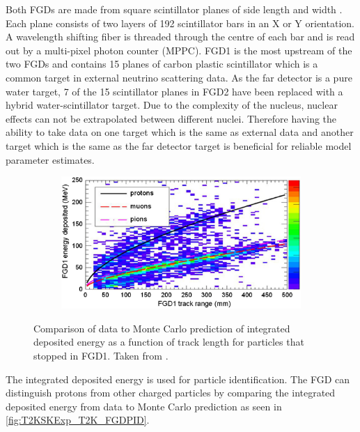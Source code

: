 Both FGDs are made from square scintillator planes of side length  and width . Each plane consists of two layers of 192 scintillator bars in an X or Y orientation. A wavelength shifting fiber is threaded through the centre of each bar and is read out by a multi-pixel photon counter (MPPC). FGD1 is the most upstream of the two FGDs and contains 15 planes of carbon plastic scintillator which is a common target in external neutrino scattering data. As the far detector is a pure water target, 7 of the 15 scintillator planes in FGD2 have been replaced with a hybrid water-scintillator target. Due to the complexity of the nucleus, nuclear effects can not be extrapolated between different nuclei. Therefore having the ability to take data on one target which is the same as external data and another target which is the same as the far detector target is beneficial for reliable model parameter estimates.

\begin{figure}[h]
  \begin{subfigure}[t]{0.7\textwidth}
    \includegraphics[width=\textwidth, trim={0mm 0mm 0mm 0mm}, clip,page=1]{Figures/Detectors/T2KFGDPID.pdf}
  \end{subfigure}
  \caption{Comparison of data to Monte Carlo prediction of integrated deposited energy as a function of track length for particles that stopped in FGD1. Taken from \cite{Amaudruz2012}.}
  \label{fig:T2KSKExp_T2K_FGDPID}
\end{figure}

The integrated deposited energy is used for particle identification. The FGD can distinguish protons from other charged particles by comparing the integrated deposited energy from data to Monte Carlo prediction as seen in \autoref{fig:T2KSKExp_T2K_FGDPID}.

